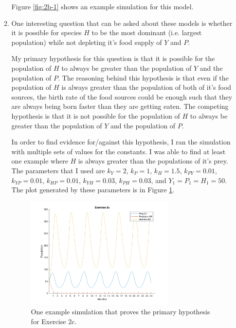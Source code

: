 \documentclass[12pt]{article}
\begin{document}
\begin{enumerate}
\begin{enumerate}
        Figure \ref{fig:2b-1} shows an example simulation for this model. 
        
      \item
  			One interesting question that can be asked about these models is whether it is possible for species $H$ to be the most dominant (i.e. largest population) while not depleting it's food supply of $Y$ and $P$.
			
			My primary hypothesis for this question is that it is possible for the population of $H$ to always be greater than the population of $Y$ and the population of $P$. The reasoning behind this hypothesis is that even if the population of $H$ is always greater than the population of both of it's food sources, the birth rate of the food sources could be enough such that they are always being born faster than they are getting eaten. The competing hypothesis is that it is not possible for the population of $H$ to always be greater than the population of $Y$ and the population of $P$.
			
			In order to find evidence for/against this hypothesis, I ran the simulation with multiple sets of values for the constants. I was able to find at least one example where $H$ is always greater than the populations of it's prey. The parameters that I used are $k_{Y} = 2$, $k_{P} = 1$, $k_{H} = 1.5$, $k_{PY} = 0.01$, $k_{YP} = 0.01$, $k_{HP} = 0.01$, $k_{YH} = 0.03$, $k_{PH} = 0.03$, and $Y_{1} = P_{1} = H_{1} = 50$. The plot generated by these parameters is in Figure \ref{fig:2c-1}.
			
			\begin{figure}[h]
  			\includegraphics[width=0.75\textwidth]{2c-1}
  			\centering
        \caption{One example simulation that proves the primary hypothesis for Exercise 2c.}
        \label{fig:2c-1}
      \end{figure}
      

\end{enumerate}
\end{enumerate}
\end{document}
